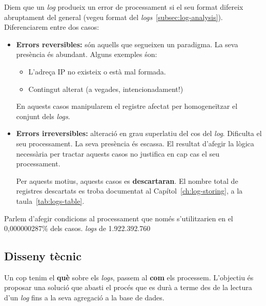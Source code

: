 \noindent
Diem que un \textit{\gls{log}} produeix un error de processament si el seu format difereix abruptament del general (vegeu format del \textit{\gls{log}s}~\ref{subsec:log-analysis}).
Diferenciarem entre dos casos:

\begin{itemize}
    \item \textbf{Errors reversibles:} són aquells que segueixen un paradigma.
    La seva presència és abundant.
    Alguns exemples śon:
    \begin{itemize}
        \item L'adreça \gls{IP} no existeix o està mal formada.
        \item Contingut alterat (a vegades, intencionadament!)
    \end{itemize}
    En aquests casos manipularem el registre afectat per homogeneïtzar el conjunt dels \textit{logs}.
    \item \textbf{Errors irreversibles:} alteració en grau superlatiu del cos del \textit{log}.
    Dificulta el seu processament.
    La seva presència és escassa.
    El resultat d'afegir la lògica necessària per tractar aquests casos no justifica en cap cas el seu processament.

    Per aquests motius, aquests casos es \textbf{descartaran}.
    El nombre total de registres descartats es troba documentat al Capítol~\ref{ch:log-storing}, a la taula~\ref{tab:logs-table}.
\end{itemize}

\noindent
\begin{tcolorbox}[colback=green!5!white, colframe=green!50!black, title=No val la pena]\label{tcbox:no-val-la-pena}
Parlem d'afegir condicions al processament que només s'utilitzarien en el 0,000000287\% dels casos.
 \textit{\gls{log}s} de 1.922.392.760
\end{tcolorbox}

\clearpage

\subsection{Disseny tècnic}\label{subsec:logs-technical-design}

Un cop tenim el \textbf{què} sobre els \textit{\gls{log}s}, passem al \textbf{com} els processem.
L'objectiu és proposar una solució que abasti el procés que es durà a terme des de la lectura d’un \textit{\gls{log}} fins a la seva agregació a la base de dades. \\

